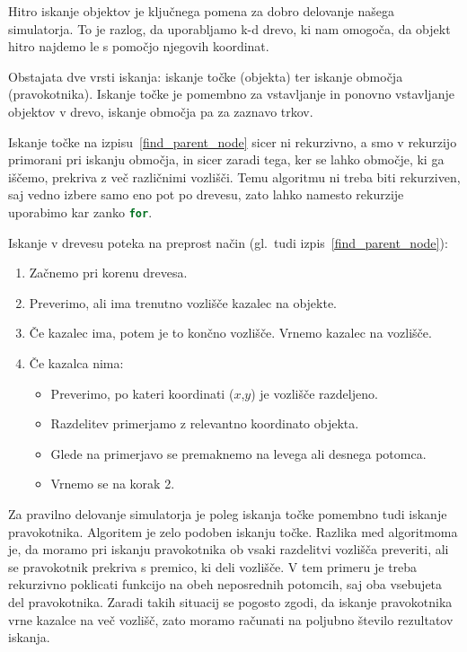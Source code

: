 \documentclass[a4paper,12pt]{article}
\begin{document}
Hitro iskanje objektov je ključnega pomena za dobro delovanje našega simulatorja.
To je razlog, da uporabljamo k-d drevo, ki nam omogoča, da objekt hitro najdemo le s
pomočjo njegovih koordinat.

Obstajata dve vrsti iskanja:
iskanje točke (objekta) ter iskanje območja (pravokotnika). Iskanje točke je pomembno za
vstavljanje in ponovno vstavljanje objektov v drevo, iskanje območja pa za zaznavo trkov.


Iskanje točke na izpisu~\ref{find_parent_node} sicer ni rekurzivno, a smo v rekurzijo primorani
pri iskanju območja, in sicer zaradi tega, ker se lahko območje, ki ga iščemo, prekriva z več različnimi vozlišči.
Temu algoritmu ni treba biti rekurziven, saj vedno izbere samo eno pot po drevesu, zato lahko namesto
rekurzije uporabimo kar zanko \lstinline[language=C]{for}.

\begin{samepage}
Iskanje v drevesu poteka na preprost način (gl.\ tudi izpis~\ref{find_parent_node}):
    \begin{enumerate}
        \item Začnemo pri korenu drevesa.
        \item Preverimo, ali ima trenutno vozlišče kazalec na objekte.
        \item Če kazalec ima, potem je to končno vozlišče. Vrnemo kazalec na vozlišče.
        \item Če kazalca nima:
        \begin{itemize}
            \item Preverimo, po kateri koordinati ($x$,$y$) je vozlišče razdeljeno.
            \item Razdelitev primerjamo z relevantno koordinato objekta.
            \item Glede na primerjavo se premaknemo na levega ali desnega potomca.
            \item Vrnemo se na korak 2.
        \end{itemize}    
    \end{enumerate}
\end{samepage}

Za pravilno delovanje simulatorja je poleg iskanja točke pomembno tudi iskanje pravokotnika. Algoritem je zelo podoben
iskanju točke. Razlika med algoritmoma je, da moramo pri iskanju pravokotnika
ob vsaki razdelitvi vozlišča preveriti, ali se pravokotnik prekriva s premico, ki deli vozlišče. V tem
primeru je treba rekurzivno poklicati funkcijo na obeh neposrednih potomcih, saj oba vsebujeta del pravokotnika. Zaradi takih
situacij se pogosto zgodi, da iskanje pravokotnika vrne kazalce na več vozlišč, zato moramo računati na poljubno število
rezultatov iskanja.
\end{document}

